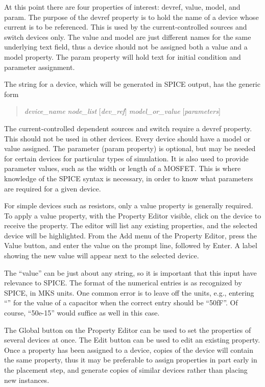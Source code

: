 At this point there are four properties of interest:  {\et devref},
{\et value}, {\et model}, and {\et param}.  The purpose of the {\et
devref} property is to hold the name of a device whose current is to
be referenced.  This is used by the current-controlled sources and
switch devices only.  The {\et value} and {\et model} are just
different names for the same underlying text field, thus a device
should not be assigned both a {\et value} and a {\et model} property. 
The {\et param} property will hold text for initial condition and
parameter assignment.

The string for a device, which will be generated in SPICE output, has
the generic form

\begin{quote}
  {\it device\_name node\_list} [{\it dev\_ref\/}] {\it model\_or\_value}
  [{\it parameters\/}]
\end{quote}

The current-controlled dependent sources and switch require a 
{\et devref} property.  This should not be used in other devices.
Every device should have a {\et model} or {\et value} assigned.  The
parameter ({\et param} property) is optional, but may be needed for
certain devices for particular types of simulation.  It is also used
to provide parameter values, such as the width or length of a MOSFET. 
This is where knowledge of the SPICE syntax is necessary, in order to
know what parameters are required for a given device.

For simple devices such as resistors, only a {\et value} property is
generally required.  To apply a {\et value} property, with the {\cb
Property Editor} visible, click on the device to receive the
property.  The editor will list any existing properties, and the
selected device will be highlighted.  From the {\cb Add} menu of the
{\cb Property Editor}, press the {\cb Value} button, and enter the
value on the prompt line, followed by {\kb Enter}.  A label showing
the new value will appear next to the selected device.

The ``value'' can be just about any string, so it is important that
this input have relevance to SPICE.  The format of the numerical
entries is as recognized by SPICE, in MKS units.  One common error is
to leave off the units, e.g., entering ``{}'' for the value of a
capacitor when the correct entry should be ``{\vt 50fF}''.  Of course,
``{\vt 50e-15}'' would suffice as well in this case.

The {\cb Global} button on the {\cb Property Editor} can be used to
set the properties of several devices at once.  The {\cb Edit} button
can be used to edit an existing property.  Once a property has been
assigned to a device, copies of the device will contain the same
property, thus it may be preferable to assign properties in part early
in the placement step, and generate copies of similar devices rather
than placing new instances.

